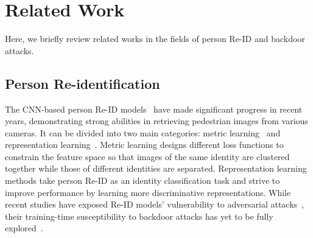 \documentclass[sigconf,authordraft]{acmart}
\begin{document}
\section{Related Work}\label{sec:related work}

Here, we briefly review related works in the fields of person Re-ID and backdoor attacks.

\subsection{Person Re-identification}
The CNN-based person Re-ID models~\cite{sun2018beyond,chen2019abd,zhang2020relation} have made significant progress in recent years, demonstrating strong abilities in retrieving pedestrian images from various cameras. It can be divided into two main categories: metric learning~\cite{sun2018beyond} and representation learning~\cite{chen2019abd,zhang2020relation,he2021transreid}.
Metric learning designs different loss functions to constrain the feature space so that images of the same identity are clustered together while those of different identities are separated.
Representation learning methods take person Re-ID as an identity classification task and strive to improve performance by learning more discriminative representations. While recent studies have exposed Re-ID models' vulnerability to adversarial attacks~\cite{bai2020adversarial,zheng2020effective}, their training-time susceptibility to backdoor attacks has yet to be fully explored~\cite{sun2022invisible}. 
\end{document}
